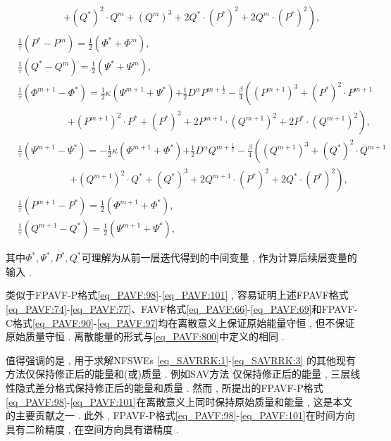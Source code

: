\begin{enumerate}[$\bullet$]
\begin{align}
		&~~~~~~~~~~~~~~~~~~~~~\left . + (Q^{*})^{2}\cdot Q^{m}+ (Q^{m})^{3}+2 Q^{*}\cdot (P^{*})^{2}+2 Q^{m}\cdot (P^{*})^{2}\right) , \label{eq_PAVF:91}\\
&\frac{1}{\tau}\left(P^{*}-P^{m}\right)=\frac{1}{2}(\varPhi^{*}+\varPhi^{m}) , \label{eq_PAVF:92}\\
&\frac{1}{\tau}\left(Q^{*}-Q^{m}\right)=\frac{1}{2}(\Psi^{*}+\Psi^{m}) , \label{eq_PAVF:93}\\
&\frac{1}{\tau}\left(\varPhi^{m+1}-\varPhi^{*}\right)=\frac{1}{2}\kappa (\Psi^{m+1}+\Psi^{*}){+\frac{1}{2}D^{\alpha} P^{m+\frac{1}{2}}}-\frac{\beta}{4}\left((P^{m+1})^3+(P^{*})^{2}\cdot P^{m+1}\right . \nonumber\\
		&~~~~~~~~~~~~~~~~~~~~~~~\left . +(P^{m+1})^{2}\cdot P^{*}+ (P^{*})^{3}+2 P^{m+1}\cdot (Q^{m+1})^{2}+2 P^{*}\cdot (Q^{m+1})^{2}\right) , \label{eq_PAVF:94}\\
&\frac{1}{\tau}\left(\Psi^{m+1}-\Psi^{*}\right)=-\frac{1}{2}\kappa (\varPhi^{m+1}+\varPhi^{*}){+\frac{1}{2}D^{\alpha} Q^{m+\frac{1}{2}}}-\frac{\beta}{4}\left((Q^{m+1})^3+(Q^{*})^{2}\cdot Q^{m+1}\right . \nonumber\\
		&~~~~~~~~~~~~~~~~~~~~~~~~\left . +(Q^{m+1})^{2}\cdot Q^{*}+ (Q^{*})^{3}+2 Q^{m+1}\cdot (P^{*})^{2}+2 Q^{*}\cdot (P^{*})^{2}\right) , \label{eq_PAVF:95}\\
&\frac{1}{\tau}\left(P^{m+1}-P^{*}\right)=\frac{1}{2}(\varPhi^{m+1}+\varPhi^{*}) , \label{eq_PAVF:96}\\
&\frac{1}{\tau}\left(Q^{m+1}-Q^{*}\right)=\frac{1}{2}(\Psi^{m+1}+\Psi^{*}) , \label{eq_PAVF:97}
\end{align}
\end{enumerate}
其中$\Phi^* , \Psi^* , P^* , Q^*$可理解为从前一层迭代得到的中间变量 , 作为计算后续层变量的输入 . 

\begin{remark}\label{rk_PAVF:1}
类似于FPAVF-P格式\eqref{eq_PAVF:98}-\eqref{eq_PAVF:101} , 容易证明上述FPAVF格式\eqref{eq_PAVF:74}-\eqref{eq_PAVF:77}、FAVF格式\eqref{eq_PAVF:66}-\eqref{eq_PAVF:69}和FPAVF-C格式\eqref{eq_PAVF:90}-\eqref{eq_PAVF:97}均在离散意义上保证原始能量守恒 , 但不保证原始质量守恒 . 离散能量的形式与\eqref{eq_PAVF:800}中定义的相同 . 
\end{remark}

\begin{remark}\label{rk_PAVF:2}
值得强调的是 , 用于求解NFSWEs \eqref{eq_SAVRRK:1}-\eqref{eq_SAVRRK:3} 的其他现有方法仅保持修正后的能量和(或)质量 . 
例如SAV方法 \cite{chengConvergenceEnergyconservingScheme2022}仅保持修正后的能量 , 
三层线性隐式差分格式\cite{ranLinearlyImplicitConservative2016}保持修正后的能量和质量 . 
然而 , 所提出的FPAVF-P格式\eqref{eq_PAVF:98}-\eqref{eq_PAVF:101}在离散意义上同时保持原始质量和能量 , 这是本文的主要贡献之一 . 
此外 , FPAVF-P格式\eqref{eq_PAVF:98}-\eqref{eq_PAVF:101}在时间方向具有二阶精度 , 在空间方向具有谱精度 . 
\end{remark}

